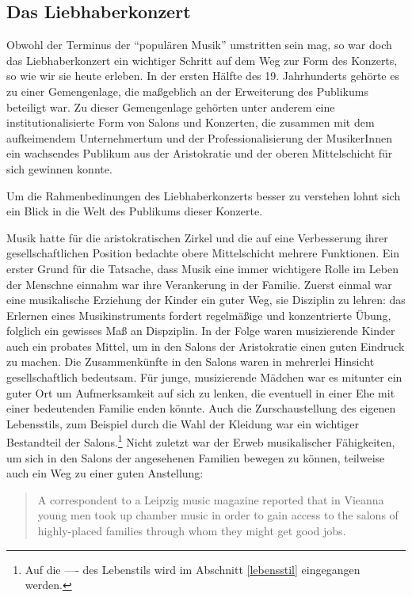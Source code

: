 \documentclass[a4paper, german, oneside]{scrbook}
\begin{document}
\subsection{Das Liebhaberkonzert}
\label{liebhaber}
Obwohl der Terminus der \enquote{populären Musik} umstritten sein mag, so war doch das Liebhaberkonzert ein wichtiger Schritt auf dem Weg zur Form des Konzerts, so wie wir sie heute erleben. In der ersten Hälfte des 19. Jahrhunderts gehörte es zu einer Gemengenlage, die maßgeblich an der Erweiterung des Publikums beteiligt war. Zu dieser Gemengenlage gehörten unter anderem eine institutionalisierte Form von Salons und Konzerten, die zusammen mit dem aufkeimendem Unternehmertum und der Professionalisierung der MusikerInnen ein wachsendes Publikum aus der Aristokratie und der oberen Mittelschicht für sich gewinnen konnte.

Um die Rahmenbedinungen des Liebhaberkonzerts besser zu verstehen lohnt sich ein Blick in die Welt des Publikums dieser Konzerte.

Musik hatte für die aristokratischen Zirkel und die auf eine Verbesserung ihrer gesellschaftlichen Position bedachte obere Mittelschicht mehrere Funktionen. Ein erster Grund für die Tatsache, dass Musik eine immer wichtigere Rolle im Leben der Menschne einnahm war ihre Verankerung in der Familie. Zuerst einmal war eine musikalische Erziehung der Kinder ein guter Weg, sie Disziplin zu lehren: das Erlernen eines Musikinstruments fordert regelmäßige und konzentrierte Übung, folglich ein gewisses Maß an Dispziplin. \parencite[35ff.]{weber_music_2004} In der Folge waren musizierende Kinder auch ein probates Mittel, um in den Salons der Aristokratie einen guten Eindruck zu machen. Die Zusammenkünfte in den Salons waren in mehrerlei Hinsicht gesellschaftlich bedeutsam. Für junge, musizierende Mädchen war es mitunter ein guter Ort um Aufmerksamkeit auf sich zu lenken, die eventuell in einer Ehe mit einer bedeutenden Familie enden könnte. Auch die Zurschaustellung des eigenen Lebensstils, zum Beispiel durch die Wahl der Kleidung war ein wichtiger Bestandteil der Salons.\footnote{Auf die ---- des Lebenstils wird im Abschnitt \ref{lebensstil} eingegangen werden.} Nicht zuletzt war der Erweb musikalischer Fähigkeiten, um sich in den Salons der angesehenen Familien bewegen zu können, teilweise auch ein Weg zu einer guten Anstellung: \blockquote[{\cite[37]{weber_music_2004}}]{A correspondent to a Leipzig music magazine reported that in Vieanna young men took up chamber music in order to gain access to the salons of highly-placed families through whom they might get good jobs.}
\end{document}
